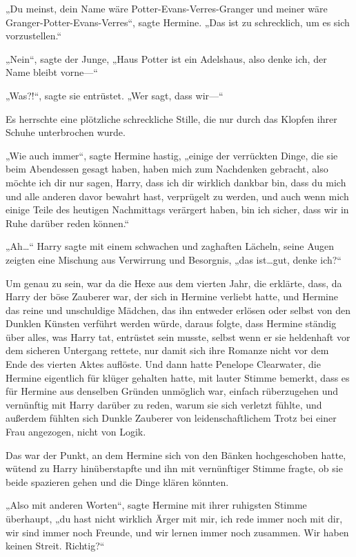 {„Du meinst, dein Name wäre Potter-Evans-Verres-Granger und meiner wäre Granger-Potter-Evans-Verres“, sagte Hermine. „Das ist zu schrecklich, um es sich vorzustellen.“

„Nein“, sagte der Junge, „Haus Potter ist ein Adelshaus, also denke ich, der Name bleibt vorne—“

„Was?!“, sagte sie entrüstet. „Wer sagt, dass wir—“

Es herrschte eine plötzliche schreckliche Stille, die nur durch das Klopfen ihrer Schuhe unterbrochen wurde.

„Wie auch immer“, sagte Hermine hastig, „einige der verrückten Dinge, die sie beim Abendessen gesagt haben, haben mich zum Nachdenken gebracht, also möchte ich dir nur sagen, Harry, dass ich dir wirklich dankbar bin, dass du mich und alle anderen davor bewahrt hast, verprügelt zu werden, und auch wenn mich einige Teile des heutigen Nachmittags verärgert haben, bin ich sicher, dass wir in Ruhe darüber reden können.“

„Ah…“ Harry sagte mit einem schwachen und zaghaften Lächeln, seine Augen zeigten eine Mischung aus Verwirrung und Besorgnis, „das ist…gut, denke ich?“

Um genau zu sein, war da die Hexe aus dem vierten Jahr, die erklärte, dass, da Harry der böse Zauberer war, der sich in Hermine verliebt hatte, und Hermine das reine und unschuldige Mädchen, das ihn entweder erlösen oder selbst von den Dunklen Künsten verführt werden würde, daraus folgte, dass Hermine ständig über alles, was Harry tat, entrüstet sein musste, selbst wenn er sie heldenhaft vor dem sicheren Untergang rettete, nur damit sich ihre Romanze nicht vor dem Ende des vierten Aktes auflöste. Und dann hatte Penelope Clearwater, die Hermine eigentlich für klüger gehalten hatte, mit lauter Stimme bemerkt, dass es für Hermine aus denselben Gründen unmöglich war, einfach rüberzugehen und vernünftig mit Harry darüber zu reden, warum sie sich verletzt fühlte, und außerdem fühlten sich Dunkle Zauberer von leidenschaftlichem Trotz bei einer Frau angezogen, nicht von Logik.

Das war der Punkt, an dem Hermine sich von den Bänken hochgeschoben hatte, wütend zu Harry hinüberstapfte und ihn mit vernünftiger Stimme fragte, ob sie beide spazieren gehen und die Dinge klären könnten.

„Also mit anderen Worten“, sagte Hermine mit ihrer ruhigsten Stimme überhaupt, „du hast nicht wirklich Ärger mit mir, ich rede immer noch mit dir, wir sind immer noch Freunde, und wir lernen immer noch zusammen. Wir haben keinen Streit. Richtig?“

}
